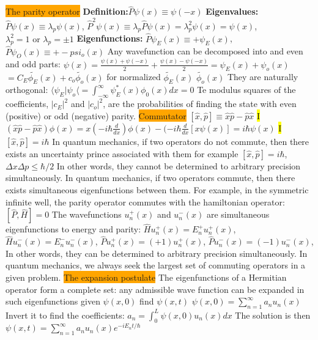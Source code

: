 \documentclass[fontsize=4pt]{scrartcl}
\begin{document}
\colorbox{Orange}{The parity operator}
\textbf{Definition:}$\hat{P} \psi (x) \equiv \psi (-x)$
\textbf{Eigenvalues:} $\hat{P} \psi (x) \equiv \lambda_p \psi (x)$,
$\hat{P}^2 \psi (x) \equiv \lambda_p \hat{P} \psi (x) = \lambda_p^2 \psi (x) = \psi(x)$,
$\lambda_p^2 = 1 \text{ or } \lambda_p = \pm 1$
\textbf{Eigenfunctions:} $\hat{P}\psi_E (x) \equiv +\psi_E(x)$,
$\hat{P}\psi_O (x) \equiv +-psi_o(x)$
Any wavefunction can be decomposed into and even and odd parts:
$\psi(x) = \frac{\psi(x) + \psi(-x)}{2}+\frac{\psi(x) - \psi(-x)}{2} = \psi_E (x) + \psi_o(x)$
$=C_E \widetilde{\phi_E}(x) + c_o \widetilde{\phi_o} (x)$ for normalized $\widetilde{\phi_E}(x)$  $\widetilde{\phi_o}(x)$
They are naturally orthogonal: $\langle \psi_E | \psi_o \langle = \int_{-\infty}^{\infty} \psi_E^* (x) \phi_0(x) dx = 0$ Te modulus squares of the coefficients, $|c_E|^2$ and $|c_o|^2$, are the probabilities of finding the state with even (positive) or odd (negative) parity.
\colorbox{Orange}{Commutator}
$[\hat{x},\hat{p}] \equiv \hat{x}\hat{p} - \hat{p}\hat{x}$
\hl{I}
$(\hat{x}\hat{p} - \hat{p}\hat{x})\phi(x) = x(-i\hbar \frac{d}{dx})\phi(x) - (-i\hbar \frac{d}{dx}[x\psi(x)] = i\hbar \psi(x)$
\hl{I}
$[\hat{x},\hat{p}] = i\hbar$
In quantum mechanics, if two operators do not commute, then there exists an uncertainty prince associated with them for example
$[\hat{x},\hat{p}] = i\hbar$, $\Delta x\Delta p \leq \hbar / 2$ 
In other words, they cannot be determined to arbitrary precision simultaneously. In quantum mechanics, if two operators commute, then there exists simultaneous eigenfunctions between them. For example, in the symmetric infinite well, the parity operator commutes with the hamiltonian operator:
$[\hat{P},\hat{H}] = 0$
The wavefunctions $u_n^+ (x)$ and $u_n^-(x)$ are simultaneous eigenfunctions to energy and parity:
$\hat{H}u_n^+ (x) = E_n^+ u_n^+ (x)$, 
$\hat{H}u_n^- (x) = E_n^- u_n^- (x)$, 
$\hat{P}u_n^+ (x) = (+1)u_n^+ (x)$, 
$\hat{P}u_n^- (x) = (-1)u_n^- (x)$, 
In other words, they can be determined to arbitrary precision simultaneously.
In quantum mechanics, we always seek the largest set of commuting operators in a given problem. 
\colorbox{Orange}{The expansion postulate}
The eigenfunctions of a Hermitian operator form a complete set: any admissible wave function can be expanded in such eigenfunctions
given $\psi(x,0)$ find $\psi(x,t)$
$\psi(x,0) = \sum_{n=1}^{\infty} a_n u_n (x)$
Invert it to find the coefficients:
$a_n = \int_0^{L} \psi (x,0) u_n (x) dx$
The solution is then 
$\psi(x,t) = \sum_{n=1}^{\infty} a_n u_n (x)e^{-iE_n t/\hbar}$
\end{document}
